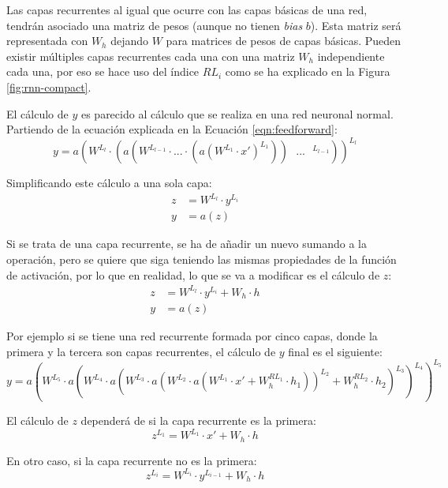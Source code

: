 Las capas recurrentes al igual que ocurre con las capas básicas de una red, tendrán asociado una matriz de pesos (aunque no tienen \textit{bias} $b$). Esta matriz será representada con $W_h$ dejando $W$ para matrices de pesos de capas básicas. Pueden existir múltiples capas recurrentes cada una con una matriz $W_h$ independiente cada una, por eso se hace uso del índice $RL_i$ como se ha explicado en la Figura \ref{fig:rnn-compact}.
\newline


El cálculo de $y$ es parecido al cálculo que se realiza en una red neuronal normal. Partiendo de la ecuación explicada en la Ecuación \ref{eqn:feedforward}:
\begin{equation}
    y = a(W^{L_l} \cdot (a(W^{L_{l-1}} \cdot ... \cdot (a(W^{L_1} \cdot x')^{L_1})) \text{ } ... \text{ } ^{L_{l-1}}))^{L_l}
\end{equation}

Simplificando este cálculo a una sola capa:
\begin{equation}
    \begin{split}
        z &= W^{L_l} \cdot y^{L_i} \\
        y &= a(z)
    \end{split}
\end{equation}

Si se trata de una capa recurrente, se ha de añadir un nuevo sumando a la operación, pero se quiere que siga teniendo las mismas propiedades de la función de activación, por lo que en realidad, lo que se va a modificar es el cálculo de $z$:
\begin{equation}
    \begin{split}
        z &= W^{L_l} \cdot y^{L_i} + W_h \cdot h \\
        y &= a(z)
    \end{split}
\end{equation}


Por ejemplo si se tiene una red recurrente formada por cinco capas, donde la primera y la tercera son capas recurrentes, el cálculo de $y$ final es el siguiente:
\begin{equation}
    y = a(W^{L_5} \cdot a(W^{L_4} \cdot a(W^{L_3} \cdot a(W^{L_2} \cdot a(W^{L_1} \cdot x' + W_h^{RL_1} \cdot h_1 ))^{L_2} + W_h^{RL_2} \cdot h_2)^{L_3})^{L_4})^{L_5}
\end{equation}


El cálculo de $z$ dependerá de si la capa recurrente es la primera:
\begin{equation}
    z^{L_1} = W^{L_1} \cdot x' + W_{h} \cdot h
\end{equation}

En otro caso, si la capa recurrente no es la primera:
\begin{equation}
    z^{L_i} = W^{L_i} \cdot y^{L_{i-1}} + W_{h} \cdot h
\end{equation}

